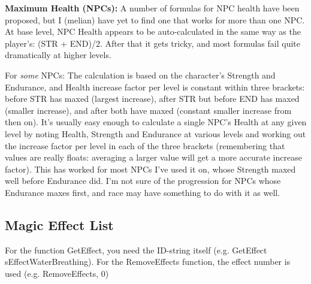 \textbf{Maximum Health (NPCs):} A number of formulas for NPC health have
been proposed, but I (melian) have yet to find one that works for more
than one NPC. At base level, NPC Health appears to be auto-calculated in
the same way as the player's: (STR + END)/2. After that it gets tricky,
and most formulas fail quite dramatically at higher levels.

For \emph{some} NPCs: The calculation is based on the character's
Strength and Endurance, and Health increase factor per level is constant
within three brackets: before STR has maxed (largest increase), after
STR but before END has maxed (smaller increase), and after both have
maxed (constant smaller increase from then on). It's usually easy enough
to calculate a single NPC's Health at any given level by noting Health,
Strength and Endurance at various levels and working out the increase
factor per level in each of the three brackets (remembering that values
are really floats: averaging a larger value will get a more accurate
increase factor). This has worked for most NPCs I've used it on, whose
Strength maxed well before Endurance did. I'm not sure of the
progression for NPCs whose Endurance maxes first, and race may have
something to do with it as well.\protect\hypertarget{_Toc53412751}{}{}

\hypertarget{magic-effect-list}{%
\subsection{Magic Effect List}\label{magic-effect-list}}

For the function GetEffect, you need the ID-string itself (e.g.
GetEffect sEffectWaterBreathing). For the RemoveEffects function, the
effect number is used (e.g. RemoveEffects, 0)

